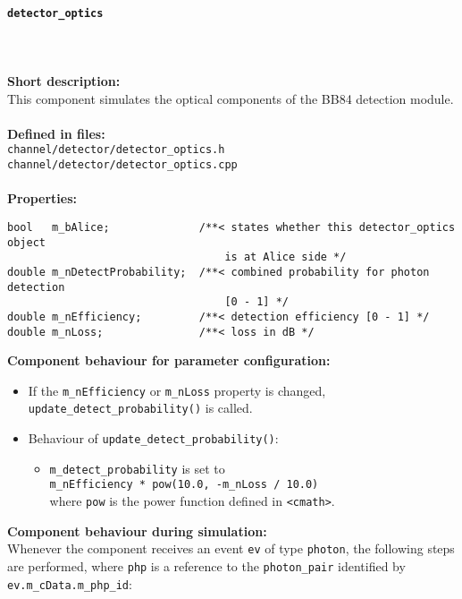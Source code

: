 \paragraph{\texttt{detector\_optics}}
\label{par:comp_detector_detopt}
\noindent \\
\\
\textbf{Short description:}\\
This component simulates the optical components of the BB84 detection module.\\
\\
\textbf{Defined in files:}\\
\texttt{channel/detector/detector\_optics.h}\\
\texttt{channel/detector/detector\_optics.cpp}\\
\\
\textbf{Properties:}
\begin{lstlisting}
bool   m_bAlice;              /**< states whether this detector_optics object
                                  is at Alice side */
double m_nDetectProbability;  /**< combined probability for photon detection
                                  [0 - 1] */
double m_nEfficiency;         /**< detection efficiency [0 - 1] */
double m_nLoss;               /**< loss in dB */
\end{lstlisting}
\noindent
\textbf{Component behaviour for parameter configuration:}
\begin{itemize}

\item If the \texttt{m\_nEfficiency} or \texttt{m\_nLoss} property is changed, \texttt{update\_detect\_probability()} is called.

\item Behaviour of \texttt{update\_detect\_probability()}:

\begin{itemize}

\item \texttt{m\_detect\_probability} is set to\\
\texttt{m\_nEfficiency * pow(10.0, -m\_nLoss / 10.0)}\\
where \texttt{pow} is the power function defined in \texttt{<cmath>}.

\end{itemize}

\end{itemize}
\noindent
\textbf{Component behaviour during simulation:}\\
Whenever the component receives an event \texttt{ev} of type \texttt{photon}, the following steps are performed, where \texttt{php} is a reference to the \texttt{photon\_pair} identified by \texttt{ev.m\_cData.m\_php\_id}:
